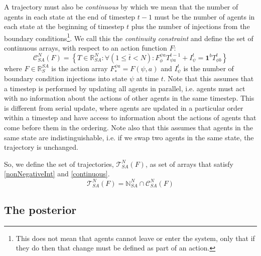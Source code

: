 \documentclass{article}
\begin{document}
A trajectory must also be \textit{continuous} by which we mean that the number of agents in each state at the end of timestep $t-1$ must be the number of agents in each state at the beginning of timestep $t$ plus the number of injections from the boundary conditions\footnote{This does not mean that agents cannot leave or enter the system, only that if they do then that change must be defined as part of an action.}. We call this the \textit{continuity constraint} and define the set of continuous arrays, with respect to an action function $F$:
\begin{equation}
\mathcal{C}^N_{SA}(F) = \left\{T\in\mathbb{R}^N_{SA}:  \forall \left(  1 \le \bar t < N\right): F^{\psi a}_{\phi} T^{t-1}_{\psi a} + I^t_\psi = \mathbf{1}^bT^{t}_{\phi b} \right\}
\label{continuous}
\end{equation}
where $F \in \mathbb{R}^{SA}_S$ is the action array $F^{\psi a}_* = F(\psi, a)$ and $I^t_\psi$ is the number of boundary condition injections into state $\psi$ at time $t$. Note that this assumes that a timestep is performed by updating all agents in parallel, i.e. agents must act with no information about the actions of other agents in the same timestep. This is different from serial update, where agents are updated in a particular order within a timestep and have access to information about the actions of agents that come before them in the ordering. Note also that this assumes that agents in the same state are indistinguishable, i.e. if we swap two agents in the same state, the trajectory is unchanged.


So, we define the set of trajectories, $\mathcal{T}^N_{SA}(F)$, as set of arrays that satisfy \eqref{nonNegativeInt} and \eqref{continuous}.
\begin{equation}
\mathcal{T}^N_{SA}(F) = \mathbb{N}^N_{SA} \cap \mathcal{C}^N_{SA}(F)
\label{SetOfTrajectories}
\end{equation}


\subsection{The posterior}
\end{document}
